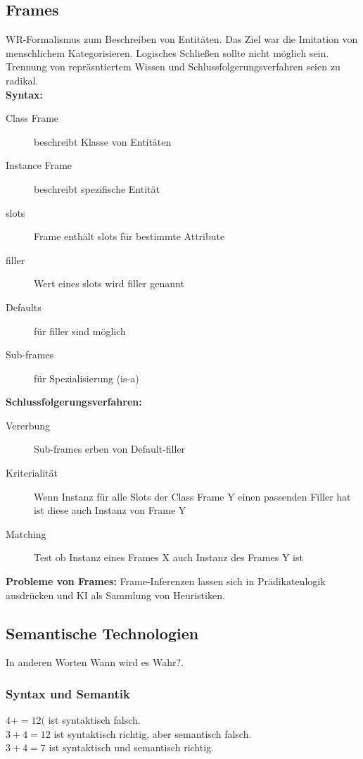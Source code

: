 \documentclass[12pt,a4paper]{article}
\begin{document}
	\subsection{Frames}
		WR-Formalismus zum Beschreiben von Entitäten. Das Ziel war die Imitation von menschlichem Kategorisieren. Logisches Schließen sollte nicht möglich sein. Trennung von repräsntiertem Wissen und Schlussfolgerungsverfahren seien zu radikal. \\
		\textbf{Syntax:}
		\begin{description}
			\item[Class Frame] beschreibt Klasse von Entitäten
			\item[Instance Frame] beschreibt spezifische Entität 
			\item[slots] Frame enthält slots für bestimmte Attribute
			\item[filler] Wert eines slots wird filler genannt
			\item[Defaults] für filler sind möglich
			\item[Sub-frames] für Spezialisierung (is-a)
		\end{description}
		\textbf{Schlussfolgerungsverfahren:}
		\begin{description}
			\item[Vererbung] Sub-frames erben von Default-filler
			\item[Kriterialität] Wenn Instanz für alle Slots der Class Frame Y einen passenden Filler hat ist diese auch Instanz von Frame Y
			\item[Matching] Test ob Instanz eines Frames X auch Instanz des Frames Y ist 
		\end{description}
		\textbf{Probleme von Frames:}
		Frame-Inferenzen lassen sich in Prädikatenlogik ausdrücken und KI als Sammlung von Heuristiken.

	\subsection{Semantische Technologien}
		In anderen Worten \glqq Wann wird es Wahr?\grqq.

		\subsubsection{Syntax und Semantik}
			$4+=12($ ist syntaktisch falsch. \\
			$3 + 4 = 12$ ist syntaktisch richtig, aber semantisch falsch. \\
			$3 + 4 = 7$ ist syntaktisch und semantisch richtig.
\end{document}
